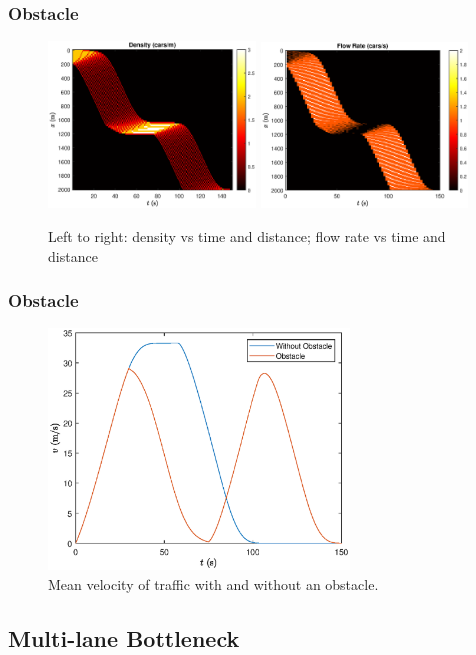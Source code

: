 \documentclass{beamer}
\begin{document}
\begin{frame}
  \frametitle{Obstacle}
  \begin{figure}[H]
    \includegraphics[width=5.5cm]{BottleNeck5.eps}
    \includegraphics[width=5.5cm]{BottleNeck6.eps}
    \caption{Left to right: density vs time and distance; flow rate vs time and distance}
\end{figure}
\end{frame}

\begin{frame}
  \frametitle{Obstacle}
  \begin{figure}[H]
    \includegraphics[width=8cm]{BottleNeck7.eps}
    \caption{Mean velocity of traffic with and without an obstacle.}
  \end{figure}
\end{frame}


\subsection{Multi-lane Bottleneck}
\end{document}
